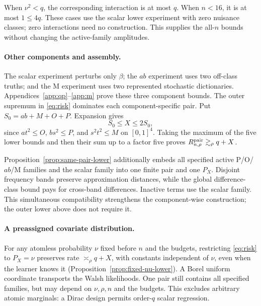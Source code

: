 \documentclass{article}
\theoremstyle{definition}
\theoremstyle{remark}
\begin{document}
When \(\nu^2<q\), the corresponding interaction is at most \(q\). When \(n<16\), it is at most \(1\le4q\). These cases use the scalar lower experiment with zero nuisance classes; zero interactions need no construction. This supplies the all-\(n\) bounds without changing the active-family amplitudes.

\paragraph{Other components and assembly.}
\label{sec:assembly}
The scalar experiment perturbs only \(\beta\); the \(ab\) experiment uses two off-class truths; and the M experiment uses two represented stochastic dictionaries. Appendices~\ref{app:qp}--\ref{app:m} prove these three component bounds. The outer supremum in \eqref{eq:risk} dominates each component-specific pair. Put \(S_0=ab+M+O+P\). Expansion gives
\begin{equation}
 S_0\le X\le2S_0,
 \label{eq:budget-equivalence}
\end{equation}
since \(at^2\le O\), \(bs^2\le P\), and \(s^2t^2\le M\) on \([0,1]^4\). Taking the maximum of the five lower bounds and then their sum up to a factor five proves \(R^{\mathrm{pair}}_{n,\rho}\gtrsim_\rho q+X\).

Proposition~\ref{prop:same-pair-lower} additionally embeds all specified active P/O/\(ab\)/M families and the scalar family into one finite pair and one \(P_X\). Disjoint frequency bands preserve approximation distances, while the global difference-class bound pays for cross-band differences. Inactive terms use the scalar family. This simultaneous compatibility strengthens the component-wise construction; the outer lower above does not require it.

\paragraph{A preassigned covariate distribution.}
For any atomless probability \(\nu\) fixed before \(n\) and the budgets, restricting \eqref{eq:risk} to \(P_X=\nu\) preserves rate \(\asymp_\rho q+X\), with constants independent of \(\nu\), even when the learner knows it (Proposition~\ref{prop:fixed-nu-lower}). A Borel uniform coordinate transports the Walsh likelihoods. One pair still contains all specified families, but may depend on \(\nu,\rho,n\) and the budgets. This excludes arbitrary atomic marginals: a Dirac design permits order-\(q\) scalar regression.
\end{document}
